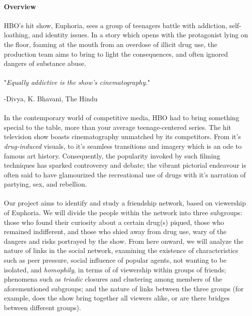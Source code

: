 \documentclass[answers]{exam}
\begin{document}
\paragraph{}
\paragraph{Overview}

\paragraph{}
HBO's hit show, Euphoria, sees a group of teenagers battle with addiction, self-loathing, and identity issues. In a story which opens with the protagonist lying on the floor, foaming at the mouth from an overdose of illicit drug use, the production team aims to bring to light the consequences, and often ignored dangers of substance abuse.

\paragraph{}
\begin{center}
    "\textit{Equally addictive is the show’s cinematography.}"
\end{center}
\flushright -Divya, K. Bhavani, The Hindu

\paragraph{} \flushleft
In the contemporary world of competitive media, HBO had to bring something special to the table, more than your average teenage-centered series. The hit television show boasts cinematography unmatched by its competitors. From it's \textit{drug-induced} visuals, to it's seamless transitions and imagery which is an ode to famous art history. Consequently, the popularity invoked by such filming techniques has sparked controversy and debate; the vibrant pictorial endeavour is often said to have glamourized the recreational use of drugs with it's narration of partying, sex, and rebellion.
\\

\paragraph{}
Our project aims to identify and study a friendship network, based on viewership of Euphoria. We will divide the people within the network into three subgroups: those who found their curiosity about a certain drug(s) piqued, those who remained indifferent, and those who shied away from drug use, wary of the dangers and risks portrayed by the show. From here onward, we will analyze the nature of links in the social network, examining the existence of characteristics such as peer pressure, social influence of popular agents, not wanting to be isolated, and \textit{homophily}, in terms of of viewership within groups of friends; phenomena such as \textit{triadic} closures and clustering among members of the aforementioned subgroups; and the nature of links between the three groups (for example, does the show bring together all viewers alike, or are there bridges between different groups).
\end{document}
